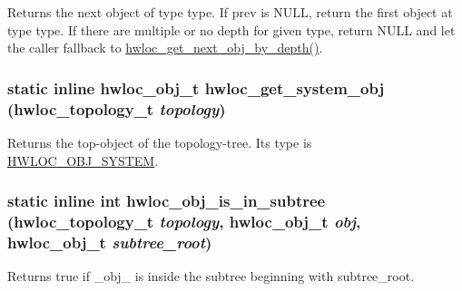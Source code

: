 Returns the next object of type {\ttfamily type}. If {\ttfamily prev} is {\ttfamily NULL}, return the first object at type {\ttfamily type}. If there are multiple or no depth for given type, return {\ttfamily NULL} and let the caller fallback to \hyperlink{group__hwlocality__helper__traversal__basic_ga5755cecb9124c5181642ac84dc5bc554}{hwloc\_\-get\_\-next\_\-obj\_\-by\_\-depth()}. \hypertarget{group__hwlocality__helper__traversal__basic_gab39658e42f1046db0f8870a0d0ba9f42}{
\subsubsection[{hwloc\_\-get\_\-system\_\-obj}]{\setlength{\rightskip}{0pt plus 5cm}static inline {\bf hwloc\_\-obj\_\-t} hwloc\_\-get\_\-system\_\-obj ({\bf hwloc\_\-topology\_\-t} {\em topology})}}
\label{group__hwlocality__helper__traversal__basic_gab39658e42f1046db0f8870a0d0ba9f42}


Returns the top-\/object of the topology-\/tree. Its type is \hyperlink{group__hwlocality__types_ggacd37bb612667dc437d66bfb175a8dc55a3aa1b842d1fd4207ebce171f95a244ec}{HWLOC\_\-OBJ\_\-SYSTEM}. \hypertarget{group__hwlocality__helper__traversal__basic_ga810bf401a37f879f864aa1ab9d10b12f}{
\subsubsection[{hwloc\_\-obj\_\-is\_\-in\_\-subtree}]{\setlength{\rightskip}{0pt plus 5cm}static inline int hwloc\_\-obj\_\-is\_\-in\_\-subtree ({\bf hwloc\_\-topology\_\-t} {\em topology}, \/  {\bf hwloc\_\-obj\_\-t} {\em obj}, \/  {\bf hwloc\_\-obj\_\-t} {\em subtree\_\-root})}}
\label{group__hwlocality__helper__traversal__basic_ga810bf401a37f879f864aa1ab9d10b12f}


Returns true if \_\-obj\_\- is inside the subtree beginning with {\ttfamily subtree\_\-root}. 
